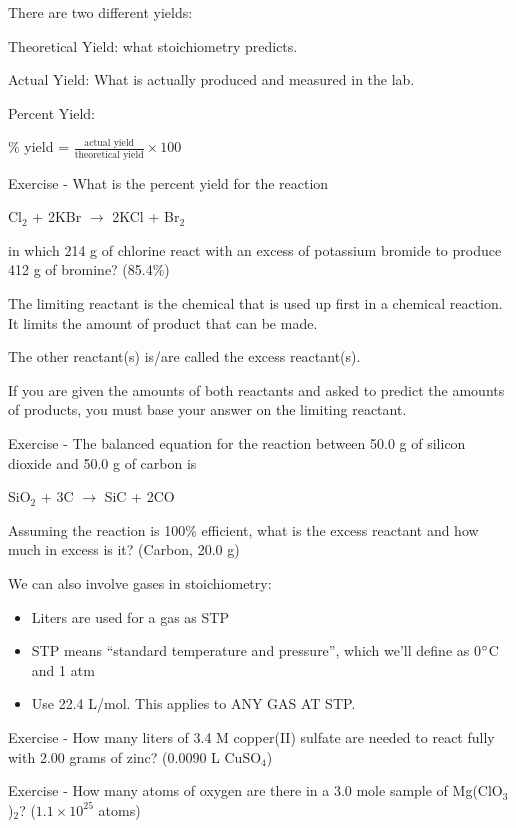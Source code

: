 \documentclass[../hchem.tex]{subfiles}
\begin{document}
There are two different yields:

Theoretical Yield: what stoichiometry predicts.

Actual Yield: What is actually produced and measured in the lab.

Percent Yield:
\begin{center}
    \% yield = $\frac{\text{actual yield}}{\text{theoretical yield}}\times 100$
\end{center}

Exercise - What is the percent yield for the reaction 
\begin{center}
    Cl$_2$ + 2KBr $\rightarrow$ 2KCl + Br$_2$
\end{center}
in which 214 g of chlorine react with an excess of potassium bromide to produce 412 g of bromine? (85.4\%)

The limiting reactant is the chemical that is used up first in a chemical reaction. It limits the amount of product that can be made.

The other reactant(s) is/are called the excess reactant(s).

If you are given the amounts of both reactants and asked to predict the amounts of products, you must base your answer on the limiting reactant.

Exercise - The balanced equation for the reaction between 50.0 g of silicon dioxide and 50.0 g of carbon is 
\begin{center}
    SiO$_2$ + 3C $\rightarrow$ SiC + 2CO
\end{center}
Assuming the reaction is 100\% efficient, what is the excess reactant and how much in excess is it? (Carbon, 20.0 g)

We can also involve gases in stoichiometry:
\begin{itemize}
    \item Liters are used for a gas as STP 
    \item STP means ``standard temperature and pressure'', which we'll define as 0$\degree$C and 1 atm 
    \item Use 22.4 L/mol. This applies to ANY GAS AT STP.
\end{itemize}

Exercise - How many liters of 3.4 M copper(II) sulfate are needed to react fully with 2.00 grams of zinc? (0.0090 L CuSO$_4$)

Exercise - How many atoms of oxygen are there in a 3.0 mole sample of Mg(ClO$_3$)$_2$? ($1.1\times 10^{25}$ atoms)
\end{document}
